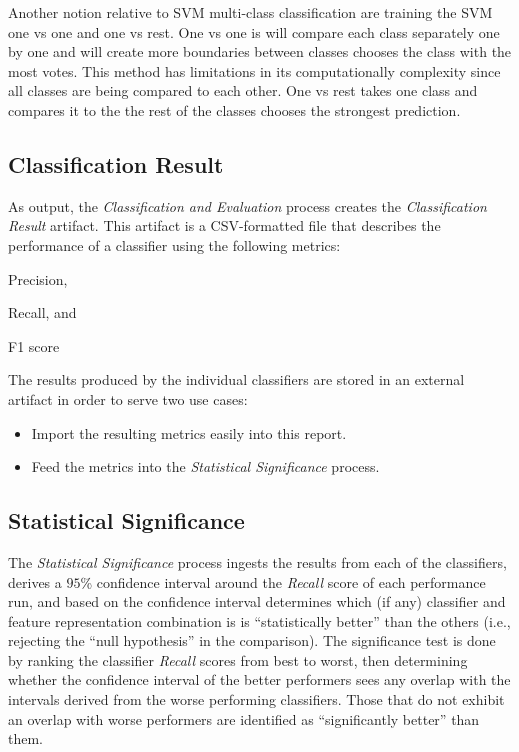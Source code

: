 \documentclass[conference]{sig-alternate-05-2015}
\begin{document}
Another notion relative to SVM multi-class classification are training the SVM
one vs one and one vs rest. One vs one is will compare each class separately one
by one and will create more boundaries between classes chooses the class with
the most votes. This method has limitations in its computationally complexity
since all classes are being compared to each other. One vs rest takes one class
and compares it to the the rest of the classes chooses the strongest prediction.
\par

\subsection{Classification Result}\label{subsec:classification_result}
As output, the \textit{Classification and Evaluation} process creates the
\textit{Classification Result} artifact. This artifact is a CSV-formatted file
that describes the performance of a classifier using the following metrics:
\begin{enumerate*}[(1)]
  \item Precision,
  \item Recall, and
  \item F1 score
\end{enumerate*}

The results produced by the individual classifiers are stored in an external
artifact in order to serve two use cases:

\begin{itemize}
  \item Import the resulting metrics easily into this report.
  \item Feed the metrics into the \textit{Statistical Significance} process.
\end{itemize}

\subsection{Statistical Significance}\label{subsec:stat_significance}
The \textit{Statistical Significance} process ingests the results from each of
the classifiers, derives a $95$\% confidence interval around the \textit{Recall}
score of each performance run, and based on the confidence interval determines
which (if any) classifier and feature representation combination is is
``statistically better'' than the others (i.e., rejecting the
``null hypothesis'' in the comparison). The significance test is done by ranking
the classifier \textit{Recall} scores from best to worst, then determining
whether the confidence interval of the better performers sees any overlap with
the intervals derived from the worse performing classifiers. Those that do not
exhibit an overlap with worse performers are identified as ``significantly
better'' than them.\par
\end{document}
